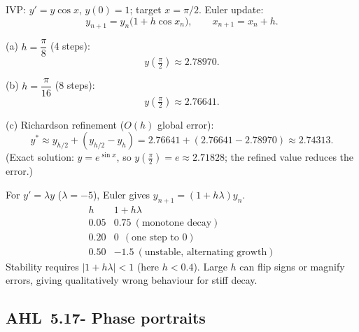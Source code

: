 \documentclass[11pt]{article}
\def\textbf#1{#1}%
\newcommand{\tocsubsection}[1]{\subsection{#1}}
\begin{document}
\begin{solution}
IVP: $y'=y\cos x$, $y(0)=1$; target $x=\pi/2$. Euler update:
\[
y_{n+1}=y_n\big(1+h\cos x_n\big),\qquad x_{n+1}=x_n+h.
\]

\textbf{(a)} $h=\dfrac{\pi}{8}$ (4 steps):
\[
y(\tfrac{\pi}{2})\approx \boxed{2.78970}.
\]

\textbf{(b)} $h=\dfrac{\pi}{16}$ (8 steps):
\[
y(\tfrac{\pi}{2})\approx \boxed{2.76641}.
\]

\textbf{(c)} Richardson refinement ($O(h)$ global error):
\[
y^\ast \approx y_{h/2}+(y_{h/2}-y_h)=2.76641+(2.76641-2.78970)\approx \boxed{2.74313}.
\]
(Exact solution: $y=e^{\sin x}$, so $y(\tfrac{\pi}{2})=e\approx 2.71828$; the refined value reduces the error.)
\end{solution}

\begin{solution}
For $y'=\lambda y$ ($\lambda=-5$), Euler gives $y_{n+1}=(1+h\lambda)y_n$.
\[
\begin{array}{c|c}
h & 1+h\lambda \\ \hline
0.05 & 0.75 \ (\text{monotone decay})\\
0.20 & 0 \ \ (\text{one step to }0)\\
0.50 & -1.5 \ (\text{unstable, alternating growth})
\end{array}
\]
Stability requires $|1+h\lambda|<1$ (here $h<0.4$). Large $h$ can flip signs or magnify errors, giving qualitatively wrong behaviour for stiff decay.
\end{solution}








\tocsubsection{AHL 5.17- Phase portraits}

\end{document}
